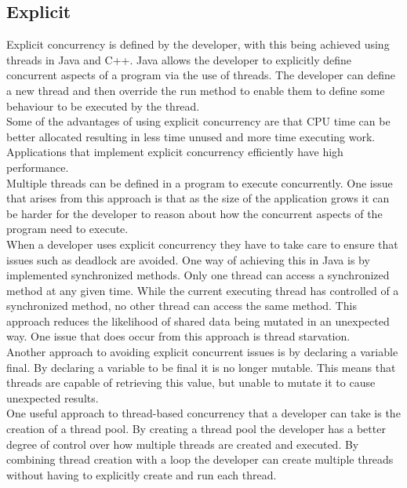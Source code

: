 \documentclass[11pt]{article}  %
\theoremstyle{definition}
\theoremstyle{remark}
\begin{document}
\subsection{Explicit}\label{ss:back}


Explicit concurrency is defined by the developer, with this being achieved using threads in Java and C++.   Java allows the developer to explicitly define concurrent aspects of a program via the use of threads.  The developer can define a new thread and then override the run method to enable them to define some behaviour to be executed by the thread.\\

Some of the advantages of using explicit concurrency are that CPU time can be better allocated resulting in less time unused and more time executing work. Applications that implement explicit concurrency efficiently have high performance.\\ 

Multiple threads can be defined in a program to execute concurrently. One issue that arises from this approach is that as the size of the application grows it can be harder for the developer to reason about how the concurrent aspects of the program need to execute.\\

When a developer uses explicit concurrency they have to take care to ensure that issues such as deadlock are avoided. One way of achieving this in Java is by implemented synchronized methods. Only one thread can access a synchronized method at any given time. While the current executing thread has controlled of a synchronized method, no other thread can access the same method. This approach reduces the likelihood of shared data being mutated in an unexpected way. One issue that does occur from this approach is thread starvation.\\

Another approach to avoiding explicit concurrent issues is by declaring a variable final. By declaring a variable to be final it is no longer mutable. This means that threads are capable of retrieving this value, but unable to mutate it to cause unexpected results.\\

One useful approach to thread-based concurrency that a developer can take is the creation of a thread pool. By creating a thread pool the developer has a better degree of control over how multiple threads are created and executed. By combining thread creation with a loop the developer can create multiple threads without having to explicitly create and run each thread.\\
\end{document}
